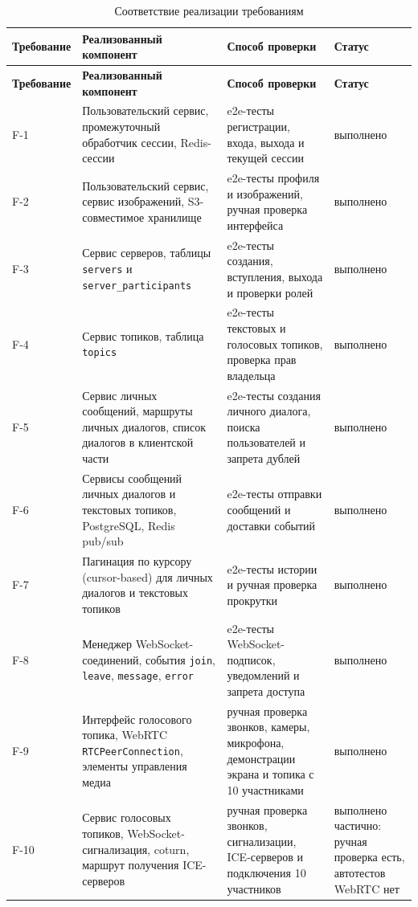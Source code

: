 \documentclass[a4paper,12pt]{extarticle}
\begin{document}
\begin{longtable}{|>{\raggedright\arraybackslash}p{2.7cm}|>{\raggedright\arraybackslash}p{4.7cm}|>{\raggedright\arraybackslash}p{4.1cm}|>{\raggedright\arraybackslash}p{4.1cm}|}
\caption{Соответствие реализации требованиям}
\label{tab:req_result}\\
\hline
\textbf{Требование} & \textbf{Реализованный компонент} & \textbf{Способ проверки} & \textbf{Статус} \\
\hline
\endfirsthead
\hline
\textbf{Требование} & \textbf{Реализованный компонент} & \textbf{Способ проверки} & \textbf{Статус} \\
\hline
\endhead
F-1 & Пользовательский сервис, промежуточный обработчик сессии, Redis-сессии & e2e-тесты регистрации, входа, выхода и текущей сессии & выполнено \\
\hline
F-2 & Пользовательский сервис, сервис изображений, S3-совместимое хранилище & e2e-тесты профиля и изображений, ручная проверка интерфейса & выполнено \\
\hline
F-3 & Сервис серверов, таблицы \texttt{servers} и \texttt{server\_participants} & e2e-тесты создания, вступления, выхода и проверки ролей & выполнено \\
\hline
F-4 & Сервис топиков, таблица \texttt{topics} & e2e-тесты текстовых и голосовых топиков, проверка прав владельца & выполнено \\
\hline
F-5 & Сервис личных сообщений, маршруты личных диалогов, список диалогов в клиентской части & e2e-тесты создания личного диалога, поиска пользователей и запрета дублей & выполнено \\
\hline
F-6 & Сервисы сообщений личных диалогов и текстовых топиков, PostgreSQL, Redis pub/sub & e2e-тесты отправки сообщений и доставки событий & выполнено \\
\hline
F-7 & Пагинация по курсору (cursor-based) для личных диалогов и текстовых топиков & e2e-тесты истории и ручная проверка прокрутки & выполнено \\
\hline
F-8 & Менеджер WebSocket-соединений, события \texttt{join}, \texttt{leave}, \texttt{message}, \texttt{error} & e2e-тесты WebSocket-подписок, уведомлений и запрета доступа & выполнено \\
\hline
F-9 & Интерфейс голосового топика, WebRTC \texttt{RTCPeerConnection}, элементы управления медиа & ручная проверка звонков, камеры, микрофона, демонстрации экрана и топика с 10 участниками & выполнено \\
\hline
F-10 & Сервис голосовых топиков, WebSocket-сигнализация, coturn, маршрут получения ICE-серверов & ручная проверка звонков, сигнализации, ICE-серверов и подключения 10 участников & выполнено частично: ручная проверка есть, автотестов WebRTC нет \\

\end{longtable}
\end{document}
